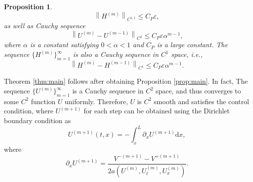 \documentclass[a4paper,reqno,11pt]{amsart}
\numberwithin{equation}{section} %
\newtheorem{prop}[lem]{Proposition}
\begin{document}
\begin{prop}
\begin{equation}
\end{equation}
\begin{equation}\label{bounds h}
 \left\lVert H^{\left( m \right)}\right\rVert  _{C^{1,1}}\leq C_P\varepsilon ,
\end{equation}
as well as Cauchy sequence 
\begin{equation}\label{cauchy u}
\left\lVert  U^{\left( m \right)}-U^{\left( m-1 \right)}\right\rVert  _{C^2}\leq C_P\varepsilon \alpha ^{m-1},
\end{equation}
where $\alpha$ is a constant satisfying $0<\alpha <1$ and $C_P$ is a large constant. The sequence $\{H^{(m)}\}_{m=1}^\infty$ is also a Cauchy sequence in $C^1$ space, i.e.,
\begin{equation}\label{cauchy h}
\left\lVert  H^{\left( m \right)}-H^{\left( m-1 \right)}\right\rVert  _{C^1}\leq C_P\varepsilon \alpha ^{m-1}.
\end{equation}
\end{prop}
Theorem \ref{thm:main} follows after obtaining Proposition \ref{prop:main}. In fact, The sequence $\{U ^{(m)}\} _{m=1} ^ \infty $ is a Cauchy sequence in $C^2$ space, and thus converges to some $C^2$ function $ U$ uniformly.%
Therefore, $U$ is $C^2$ smooth and satisfies the control condition, where $U^{(m+1)}$ for each step can be 
obtained using the Dirichlet boundary condition as
$$
U^{(m+1)}(t,x)=-\int_x^L \partial _x U^{(m+1)} \text{d} x,
$$
where
$$
\partial _x U^{(m+1)}=\frac{V^{-\left( m+1 \right) }-V^{+\left( m+1 \right)}}{ 2a\left({U}^{\left( m \right)} ,U_{t}^{\left( m \right)},U_{x}^{\left( m \right)} \right)}.
$$
\end{document}
